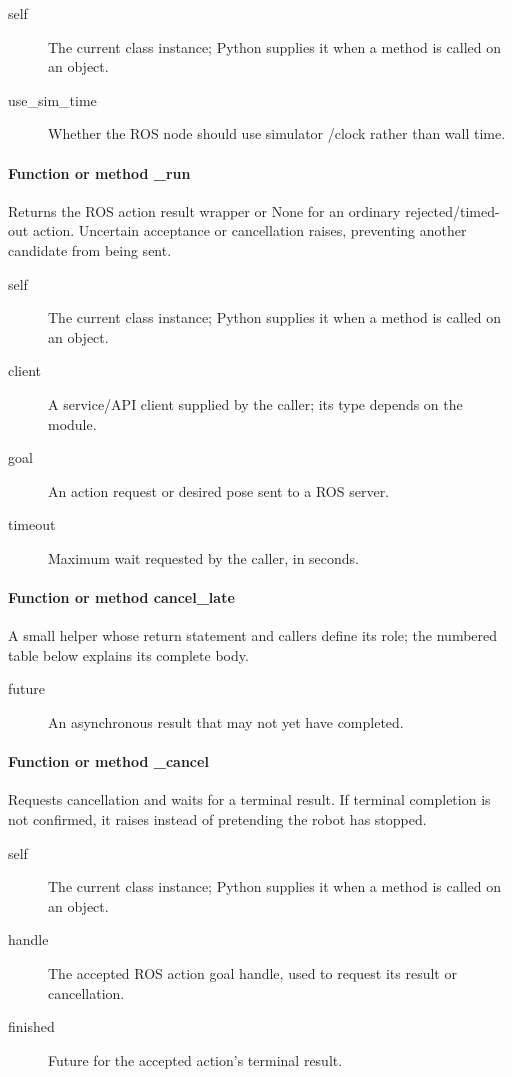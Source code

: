 \documentclass[11pt,a4paper]{book}
\begin{document}
\begin{description}
\item[self] The current class instance; Python supplies it when a method is called on an object.
\item[use\_sim\_time] Whether the ROS node should use simulator /clock rather than wall time.
\end{description}

\paragraph{Function or method \_run}
Returns the ROS action result wrapper or None for an ordinary rejected/timed-out action. Uncertain acceptance or cancellation raises, preventing another candidate from being sent.

\begin{description}
\item[self] The current class instance; Python supplies it when a method is called on an object.
\item[client] A service/API client supplied by the caller; its type depends on the module.
\item[goal] An action request or desired pose sent to a ROS server.
\item[timeout] Maximum wait requested by the caller, in seconds.
\end{description}

\paragraph{Function or method cancel\_late}
A small helper whose return statement and callers define its role; the numbered table below explains its complete body.

\begin{description}
\item[future] An asynchronous result that may not yet have completed.
\end{description}

\paragraph{Function or method \_cancel}
Requests cancellation and waits for a terminal result. If terminal completion is not confirmed, it raises instead of pretending the robot has stopped.

\begin{description}
\item[self] The current class instance; Python supplies it when a method is called on an object.
\item[handle] The accepted ROS action goal handle, used to request its result or cancellation.
\item[finished] Future for the accepted action's terminal result.
\end{description}
\end{document}
